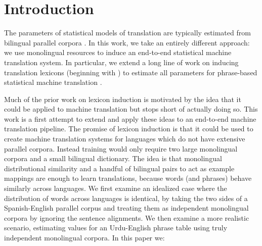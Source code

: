 \documentclass[11pt]{article}
\newcommand{\mtodo}[1]{}
\begin{document}
\begin{abstract}
\end{abstract}


\section{Introduction} \label{sect:intro}

The parameters of statistical models of translation are typically estimated from bilingual parallel corpora \cite{Brown:1993}. 
In this work, we take an entirely different approach: we use monolingual resources to induce an end-to-end statistical machine translation system.  In particular, we extend a long line of work on inducing translation lexicons (beginning with ) to estimate all parameters for phrase-based statistical machine translation \cite{Koehn:2003}.

Much of the prior work on lexicon induction is motivated by the idea that it could be applied to machine translation but stops short of actually doing so.  This work is a first attempt to extend and apply these ideas to an end-to-end machine translation pipeline. 
The promise of lexicon induction is that it could be used to create machine translation systems for languages which do not have extensive parallel corpora. 
Instead training would only require two large monolingual corpora and a small bilingual dictionary. %
The idea is that monolingual distributional similarity and a handful of bilingual pairs to act as example mappings are enough to learn translations, because words (and phrases) behave similarly across languages.  
We first examine an idealized case where the distribution of words across languages is identical, by taking the two sides of a Spanish-English parallel corpus and treating them as independent monolingual corpora by ignoring the sentence alignments. 
We then examine a more realistic scenario, estimating values for an Urdu-English phrase table using truly independent monolingual corpora.
In this paper we:
\end{document}
